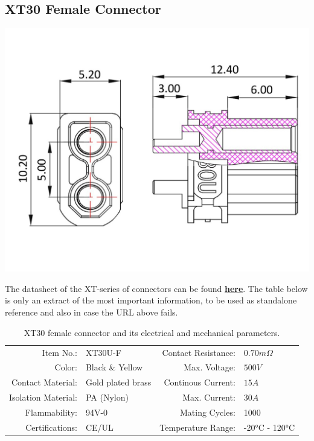 \subsection{XT30 Female Connector}

\includegraphics[width=\textwidth]{contents/figures/xt30_f.jpg}

The datasheet of the XT-series of connectors can be found \href{https://www.lcsc.com/datasheet/lcsc_datasheet_2304140030_Changzhou-Amass-Elec-XT30U-F_C99102.pdf}{\textbf{\underline{here}}}.
The table below is only an extract of the most important information, to be used as standalone reference and also in case the URL above fails.

\begin{table}[h] %
    \begin{tabular}{rlrl}
         Item No.:&  XT30U-F &  Contact Resistance:& $0.70m \Omega$\\
         Color:&  Black \& Yellow&  Max. Voltage:& $500V$\\
         Contact Material:&  Gold plated brass&  Continous Current:& $15A$\\
         Isolation Material:&  PA (Nylon)&  Max. Current:& $30A$\\
         Flammability:&  94V-0&  Mating Cycles:& 1000\\
         Certifications:&  CE/UL&  Temperature Range:& -20°C - 120°C\\
    \end{tabular}
    \caption{XT30 female connector and its electrical and mechanical parameters.}
    \label{xt30_f_specs}
\end{table}

